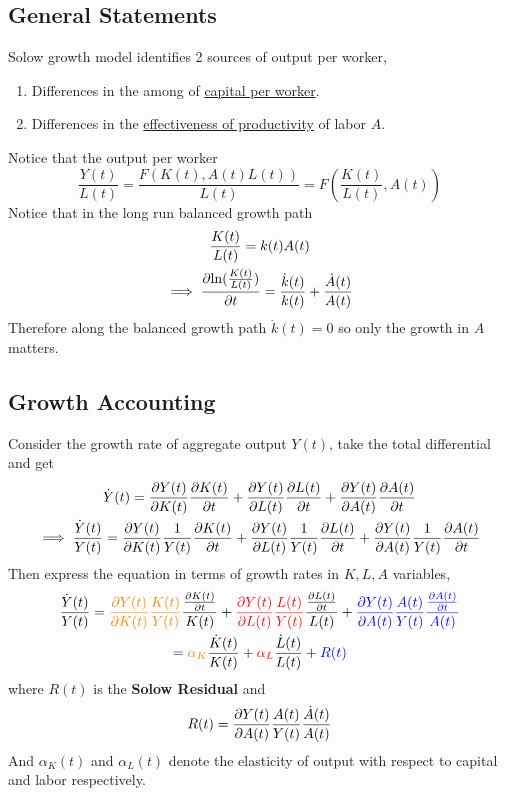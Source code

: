 \documentclass[]{article}
\begin{document}
	    \subsection{General Statements}
	    \par Solow growth model identifies 2 sources of output per worker,
	    \begin{enumerate}
	    	\item Differences in the among of \ul{capital per worker}.
	    	\item Differences in the \ul{effectiveness of productivity} of labor $A$.
	    \end{enumerate}
	    Notice that the output per worker 
	    \[
	    	\frac{Y(t)}{L(t)} = \frac{F(K(t), A(t)L(t))}{L(t)} = F(\frac{K(t)}{L(t)}, A(t))
	    \]
	    Notice that in the long run balanced growth path
	    \begin{gather*}
	    	\frac{K(t)}{L(t)} = k(t)A(t) \\
	    	\implies \frac{\partial{\ln(\frac{K(t)}{L(t)})}}{\partial{t}} = \frac{\dot{k}(t)}{k(t)} + \frac{\dot{A}(t)}{A(t)}
	    \end{gather*}
	    Therefore along the balanced growth path $\dot{k}(t) = 0$ so only the growth in $A$ matters.
	    
	    \subsection{Growth Accounting}
	    \par Consider the growth rate of aggregate output $Y(t)$, take the total differential and get
	    \begin{gather}
	    	\dot{Y}(t) = \frac{\partial{Y(t)}}{\partial{K(t)}} \frac{\partial{K(t)}}{\partial{t}} + \frac{\partial{Y(t)}}{\partial{L(t)}} \frac{\partial{L(t)}}{\partial{t}} + \frac{\partial{Y(t)}}{\partial{A(t	)}}\frac{\partial{A(t)}}{\partial{t}} \\
	    	\implies 
	    	\frac{\dot{Y}(t)}{Y(t)} = \frac{\partial{Y(t)}}{\partial{K(t)}} \frac{1}{Y(t)} \frac{\partial{K(t)}}{\partial{t}} + \frac{\partial{Y(t)}}{\partial{L(t)}} \frac{1}{Y(t)} \frac{\partial{L(t)}}{\partial{t}} + \frac{\partial{Y(t)}}{\partial{A(t)}} \frac{1}{Y(t)} \frac{\partial{A(t)}}{\partial{t}} 
	    \end{gather}
	    Then express the equation in terms of growth rates in $K, L, A$ variables,
	    \begin{gather}
	    	\frac{\dot{Y}(t)}{Y(t)} = \textcolor{orange}{\frac{\partial{Y(t)}}{\partial{K(t)}} \frac{K(t)}{Y(t)}}\frac{\frac{\partial{K(t)}}{\partial{t}}}{K(t)} 
	    	+ \textcolor{red}{\frac{\partial{Y(t)}}{\partial{L(t)}} \frac{L(t)}{Y(t)}} \frac{\frac{\partial{L(t)}}{\partial{t}}}{L(t)} 
	    	+ \textcolor{blue}{\frac{\partial{Y(t)}}{\partial{A(t)}} \frac{A(t)}{Y(t)} \frac{\frac{\partial{A(t)}}{\partial{t}}}{A(t)}}
	    	\\
	    	= \textcolor{orange}{\alpha_K} \frac{\dot{K}(t)}{K(t)} 
	    	+ \textcolor{red}{\alpha_L} \frac{\dot{L}(t)}{L(t)} 
	    	+ \textcolor{blue}{R(t)}
	    \end{gather}
	    where $R(t)$ is the \textbf{Solow Residual} and 
	    \begin{equation}
	    	R(t) = \frac{\partial{Y(t)}}{\partial{A(t)}} \frac{A(t)}{Y(t)} \frac{\dot{A}(t)}{A(t)}
	    \end{equation}
	    And $\alpha_K(t)$ and $\alpha_L(t)$ denote the elasticity of output with respect to capital and labor respectively.
	    
\end{document}
